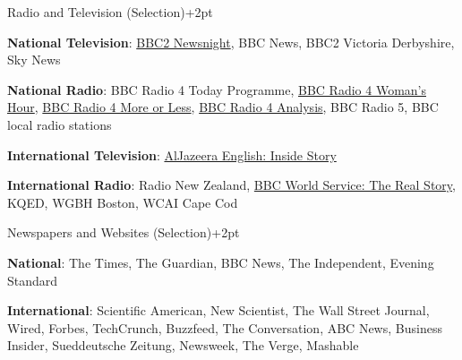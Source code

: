 \documentclass{resume} %
\begin{document}
\begin{rSection}{Radio and Television (Selection)}\itemsep +2pt

\item \textbf{National Television}: {\href{https://youtu.be/OPVq3L_Ct-4}{BBC2 Newsnight}}, BBC News, BBC2 Victoria Derbyshire, Sky News
\item \textbf{National Radio}: BBC Radio 4 Today Programme, {\href{https://www.bbc.co.uk/sounds/play/p06f89k6}{BBC Radio 4 Woman's Hour}}, {\href{https://www.bbc.co.uk/sounds/play/m0002cn1}{BBC Radio 4 More or Less}}, {\href{https://www.bbc.co.uk/sounds/play/b09w05zk}{BBC Radio 4 Analysis}}, BBC Radio 5, BBC local radio stations 
\item \textbf{International Television}: {\href{https://www.aljazeera.com/programmes/insidestory/2019/01/social-media-depression-190104191521310.html}{AlJazeera English: Inside Story}}
\item \textbf{International Radio}: Radio New Zealand, {\href{https://www.bbc.co.uk/sounds/play/w3cstygs}{BBC World Service: The Real Story}}, KQED, WGBH Boston, WCAI Cape Cod

\end{rSection}

\begin{rSection}{Newspapers and Websites (Selection)}\itemsep +2pt

\item \textbf{National}: The Times, The Guardian, BBC News, The Independent, Evening Standard
\item \textbf{International}: Scientific American, New Scientist, The Wall Street Journal, Wired, Forbes, TechCrunch, Buzzfeed, The Conversation, ABC News, Business Insider, Sueddeutsche Zeitung, Newsweek, The Verge, Mashable

\end{rSection}
\end{document}
